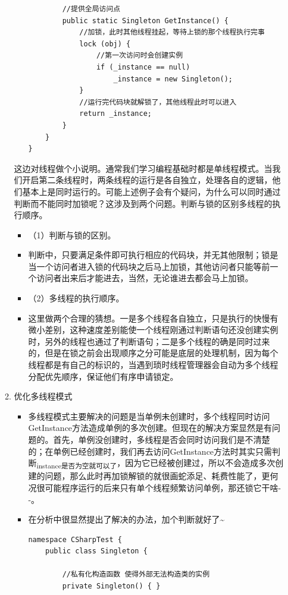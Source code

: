 \documentclass[9pt, b5paper]{article}
\begin{document}
\begin{enumerate}
\begin{enumerate}
\begin{itemize}
\begin{verbatim}
        //提供全局访问点
        public static Singleton GetInstance() {
            //加锁，此时其他线程挂起，等待上锁的那个线程执行完事
            lock (obj) {
                //第一次访问时会创建实例
                if (_instance == null)
                    _instance = new Singleton();
            }
            //运行完代码块就解锁了，其他线程此时可以进入
            return _instance;
        }
    }
}
\end{verbatim}
\end{itemize}
这边对线程做个小说明。通常我们学习编程基础时都是单线程模式。当我们开启第二条线程时，两条线程的运行是各自独立，处理各自的逻辑，他们基本上是同时运行的。可能上述例子会有个疑问，为什么可以同时通过判断而不能同时加锁呢？这涉及到两个问题。判断与锁的区别多线程的执行顺序。 
\begin{itemize}
\item （1）判断与锁的区别。
\item 判断中，只要满足条件即可执行相应的代码块，并无其他限制；锁是当一个访问者进入锁的代码块之后马上加锁，其他访问者只能等前一个访问者出来后才能进去，当然，无论谁进去都会马上加锁。
\item （2）多线程的执行顺序。
\item 这里做两个合理的猜想。一是多个线程各自独立，只是执行的快慢有微小差别，这种速度差别能使一个线程刚通过判断语句还没创建实例时，另外的线程也通过了判断语句；二是多个线程的确是同时过来的，但是在锁之前会出现顺序之分可能是底层的处理机制，因为每个线程都是有自己的标识的，当遇到琐时线程管理器会自动为多个线程分配优先顺序，保证他们有序申请锁定。
\end{itemize}
\item 优化多线程模式
\label{sec:orga8733fe}
\begin{itemize}
\item 多线程模式主要解决的问题是当单例未创建时，多个线程同时访问GetInstance方法造成单例的多次创建。但现在的解决方案显然是有问题的。首先，单例没创建时，多线程是否会同时访问我们是不清楚的；在单例已经创建时，我们再去访问GetInstance方法时其实只需判断\textsubscript{instance是否为空就可以了}，因为它已经被创建过，所以不会造成多次创建的问题，那么此时再加锁解锁的就很画蛇添足、耗费性能了，更何况很可能程序运行的后来只有单个线程频繁访问单例，那还锁它干啥- -。
\item 在分析中很显然提出了解决的办法，加个判断就好了\textasciitilde{}
\begin{verbatim}
namespace CSharpTest {
    public class Singleton {
        
        //私有化构造函数 使得外部无法构造类的实例
        private Singleton() { }
        

\end{verbatim}
\end{itemize}
\end{enumerate}
\end{enumerate}
\end{document}
